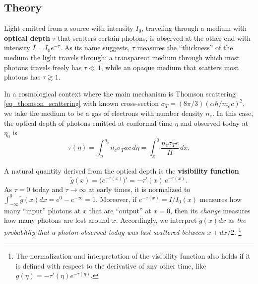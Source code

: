 \documentclass[10pt,a4paper]{article}
\begin{document}
\subsection{Theory}

Light emitted from a source with intensity $I_0$,
traveling through a medium with \textbf{optical depth} $\tau$ that scatters certain photons,
is observed at the other end with intensity $I = I_0 e^{-\tau}$.
As its name suggests, $\tau$ measures the ``thickness'' of the medium the light travels through:
a transparent medium through which most photons travels freely has $\tau \ll 1$,
while an opaque medium that scatters most photons has $\tau \gtrsim 1$.

In a cosmological context where the main mechanism is Thomson scattering \eqref{eq_thomson_scattering} with known cross-section $\sigma_T = (8\pi/3) (\alpha \hbar / m_e c)^2$,
we take the medium to be a gas of electrons with number density $n_e$.
In this case, the optical depth of photons emitted at conformal time $\eta$ and observed today at $\eta_0$ is
\begin{equation}
	\tau(\eta) = \int_\eta^{\eta_0} n_e \sigma_T a c \, d\eta = \int_x^0 \frac{n_e \sigma_T c}{H} \, dx.
\label{eq_optical_depth}
\end{equation}

A natural quantity derived from the optical depth is the \textbf{visibility function}
\begin{equation}
	\tilde{g}(x) = \Big( e^{-\tau(x)} \Big)' = -\tau'(x) \, e^{-\tau(x)}.
\label{eq_visibility_function}
\end{equation}
As $\tau=0$ today and $\tau \rightarrow \infty$ at early times,
it is normalized to $\int_{-\infty}^0 \tilde{g}(x) dx = e^0 - e^{-\infty}= 1$.
Moreover, if $e^{-\tau(x)} = I/I_0(x)$ measures how many ``input'' photons at $x$ that are ``output'' at $x=0$,
then its \emph{change} measures how many photons are lost around $x$.
Accordingly, we interpret $\tilde{g}(x) dx$ as \emph{the probability that a photon observed today was last scattered between $x \pm dx/2$}.%
\footnote{The normalization and interpretation of the visibility function also holds if it is defined with respect to the derivative of any other time, like $g(\eta) = -\tau'(\eta) e^{-\tau(\eta)}$.}
\end{document}
